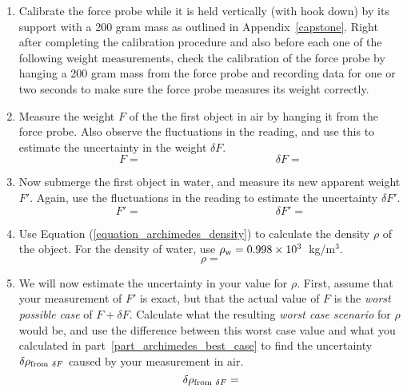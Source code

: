 \begin{enumerate}[labparts]
\item Calibrate the force probe while it is held vertically (with hook down) by its support with a 200 gram mass as outlined in Appendix~\ref{capstone}. Right after completing the calibration procedure and also before each one of the following weight measurements, check the calibration of the force probe by hanging a 200 gram mass from the force probe and recording data for one or two seconds to make sure the force probe measures its weight correctly. 


\item Measure the weight $F$ of the the first object in air by hanging it from the force probe.  Also observe the fluctuations in the reading, and use this to estimate the uncertainty in the weight $\delta F$.
\medskip
$$
F= \hspace{2in}
\delta F =
$$

\item Now submerge the first object in water, and measure its new apparent weight $F'$.  Again, use the fluctuations in the reading to estimate the uncertainty $\delta F'$.
\medskip
$$
F'= \hspace{2in}
\delta F' =
$$

\item Use Equation (\ref{equation_archimedes_density}) to calculate the density $\rho$ of the object.  For the density of water, use $\rho_{\rm w}=0.998 \times 10^3$~kg/m$^3$. \label{part_archimedes_best_case}
\answerspace{0.75in}
$$
\rho =
$$

\item We will now estimate the uncertainty in your value for $\rho$.  First, assume that your measurement of $F'$ is exact, but that the actual value of $F$ is the \textit{worst possible case} of $F + \delta F$.  Calculate what the resulting \textit{worst case scenario} for $\rho$ would be, and use the difference between this worst case value and what you calculated in part~\ref{part_archimedes_best_case} to find the uncertainty $\delta \rho_{{\rm from~} \delta F}$ caused by your measurement in air.
\answerspace{0.75in}
$$
\delta \rho_{{\rm from~} \delta F} =
$$


\end{enumerate}
